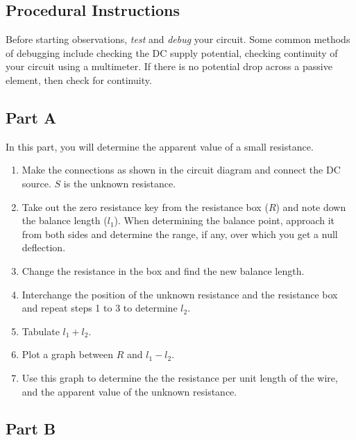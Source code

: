 \begin{refsection}
\section*{Procedural Instructions}

\begin{imp}
Before starting observations, \textit{test} and \textit{debug} your circuit. Some common methods of debugging include checking the DC supply potential, checking continuity of your circuit using a multimeter. If there is no potential drop across a passive element, then check for continuity.
\end{imp}


\subsection*{Part A}

In this part, you will determine the apparent value of a small resistance.

\begin{enumerate}
    \item Make the connections as shown in the circuit diagram and connect the DC source. $S$ is the unknown resistance.
    \item Take out the zero resistance key from the resistance box ($R$) and note down the balance length ($l_1$). When determining the balance point, approach it from both sides and determine the range, if any, over which you get a null deflection. 
    \item Change the resistance in the box and find the new balance length.
    \item Interchange the position of the unknown resistance and the resistance box and repeat steps 1 to 3 to determine $l_2$.
    \item Tabulate $l_1 + l_2$.
    \item Plot a graph between $R$ and $l_1 -l_2$.
    \item Use this graph to determine the the resistance per unit length of the wire, and the apparent value of the unknown resistance.
\end{enumerate}

\subsection*{Part B}


\end{refsection}
